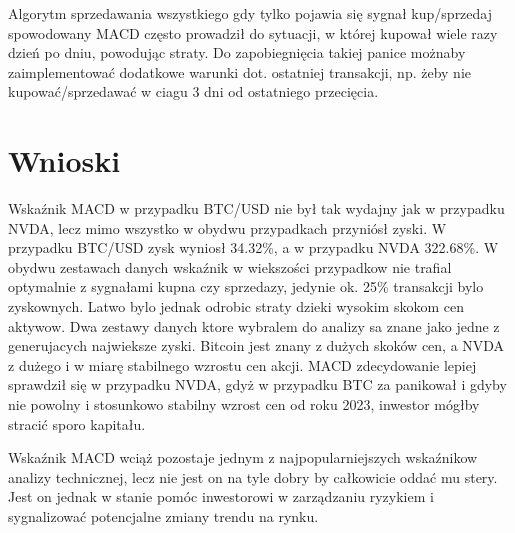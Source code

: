 \documentclass[a4paper,12pt]{article}  %
\begin{document}
Algorytm sprzedawania wszystkiego gdy tylko pojawia się sygnał kup/sprzedaj 
spowodowany MACD często prowadził do sytuacji, w której kupował wiele razy dzień
po dniu, powodując straty. Do zapobiegnięcia takiej panice możnaby
zaimplementować dodatkowe warunki dot. ostatniej transakcji, np. żeby nie
kupować/sprzedawać w ciagu 3 dni od ostatniego przecięcia.

\section{Wnioski}

Wskaźnik MACD w przypadku BTC/USD nie był tak wydajny jak w przypadku NVDA,
lecz mimo wszystko w obydwu przypadkach przyniósł zyski. W przypadku BTC/USD
zysk wyniosł 34.32\%, a w przypadku NVDA 322.68\%. W obydwu zestawach danych
wskaźnik w wiekszości przypadkow nie trafial optymalnie z sygnałami kupna
czy sprzedazy, jedynie ok. 25\% transakcji bylo zyskownych. Latwo bylo jednak 
odrobic straty dzieki wysokim skokom cen aktywow. Dwa zestawy danych ktore
wybralem do analizy sa znane jako jedne z generujacych najwieksze zyski.
Bitcoin jest znany z dużych skoków cen, a NVDA z dużego i w miarę stabilnego 
wzrostu cen akcji. MACD zdecydowanie lepiej sprawdził się w przypadku NVDA,
gdyż w przypadku BTC za panikował i gdyby nie powolny i stosunkowo stabilny 
wzrost cen od roku 2023, inwestor mógłby stracić sporo kapitału.

Wskaźnik MACD wciąż pozostaje jednym z najpopularniejszych wskaźnikow analizy 
technicznej, lecz nie jest on na tyle dobry by całkowicie oddać mu stery.
Jest on jednak w stanie pomóc inwestorowi w zarządzaniu ryzykiem i sygnalizować
potencjalne zmiany trendu na rynku.


\printbibliography
\end{document}
